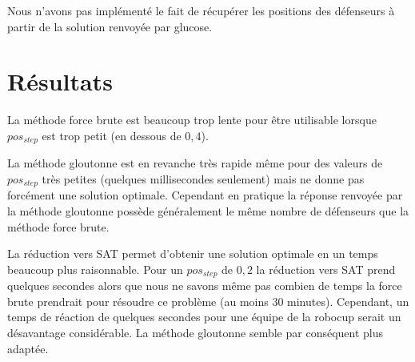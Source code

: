 Nous n'avons pas implémenté le fait de récupérer les positions des défenseurs à partir de la solution renvoyée par glucose. 

\section{Résultats}

La méthode force brute est beaucoup trop lente pour être utilisable lorsque $pos_{step}$ est trop petit (en dessous de $0,4$). \newline

La méthode gloutonne est en revanche très rapide même pour des valeurs de $pos_{step}$ très petites (quelques millisecondes seulement) mais ne donne pas forcément une solution optimale. 
Cependant en pratique la réponse renvoyée par la méthode gloutonne possède généralement le même nombre de défenseurs que la méthode force brute. \newline

La réduction vers SAT permet d'obtenir une solution optimale en un temps beaucoup plus raisonnable. Pour un $pos_{step}$ de $0,2$ la réduction vers SAT prend quelques secondes alors que nous ne savons même pas combien de temps la force brute prendrait pour résoudre ce problème (au moins 30 minutes). Cependant, un temps de réaction de quelques secondes pour une équipe de la robocup serait un désavantage considérable. La méthode gloutonne semble par conséquent plus adaptée.